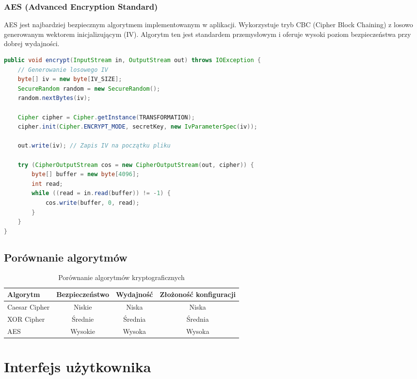 \documentclass[12pt,a4paper]{article}
\begin{document}
\subsubsection{AES (Advanced Encryption Standard)}

AES jest najbardziej bezpiecznym algorytmem implementowanym w aplikacji. Wykorzystuje tryb CBC (Cipher Block Chaining) z losowo generowanym wektorem inicjalizującym (IV). Algorytm ten jest standardem przemysłowym i oferuje wysoki poziom bezpieczeństwa przy dobrej wydajności.

\begin{lstlisting}[language=java, caption=Implementacja AES]
public void encrypt(InputStream in, OutputStream out) throws IOException {
    // Generowanie losowego IV
    byte[] iv = new byte[IV_SIZE];
    SecureRandom random = new SecureRandom();
    random.nextBytes(iv);
    
    Cipher cipher = Cipher.getInstance(TRANSFORMATION);
    cipher.init(Cipher.ENCRYPT_MODE, secretKey, new IvParameterSpec(iv));
    
    out.write(iv); // Zapis IV na początku pliku
    
    try (CipherOutputStream cos = new CipherOutputStream(out, cipher)) {
        byte[] buffer = new byte[4096];
        int read;
        while ((read = in.read(buffer)) != -1) {
            cos.write(buffer, 0, read);
        }
    }
}
\end{lstlisting}

\subsection{Porównanie algorytmów}

\begin{table}[H]
\centering
\caption{Porównanie algorytmów kryptograficznych}
\label{tab:algorithms}
\begin{tabular}{@{}lccc@{}}
\toprule
Algorytm & Bezpieczeństwo & Wydajność & Złożoność konfiguracji \\
\midrule
Caesar Cipher & Niskie & Niska & Niska \\
XOR Cipher & Średnie & Średnia & Średnia \\
AES & Wysokie & Wysoka & Wysoka \\
\bottomrule
\end{tabular}
\end{table}

\section{Interfejs użytkownika}
\end{document}
